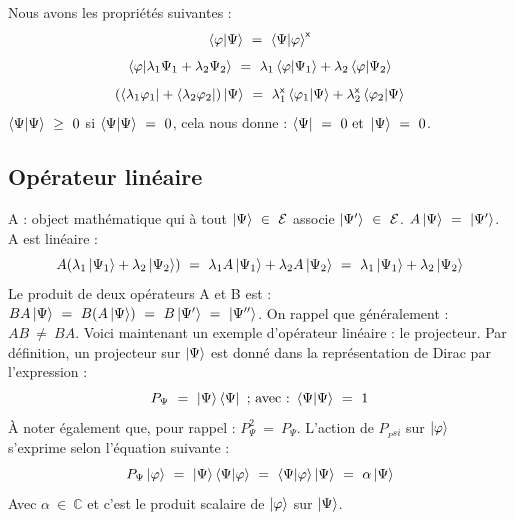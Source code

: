 \documentclass[12pt,a4paper,titlepage]{book}
\begin{document}
Nous avons les propriétés suivantes :\\
\begin{equation*}
\braket{\varphi | \Psi} ~=~ \braket{\Psi | \varphi}^{\mathsf{x}}
\end{equation*}
\begin{equation*}
\braket{\varphi | \lambda_1 \Psi_1 + \lambda_2 \Psi_2} ~=~ \lambda_1 \braket{\varphi | \Psi_1} + \lambda_2 \braket{\varphi | \Psi_2}
\end{equation*}
\begin{equation*}
\left( \bra{\lambda_1 \varphi_1} + \bra{\lambda_2 \varphi_2} \right) \ket{\Psi} ~=~ \lambda_1^{\mathsf{x}} \braket{\varphi_1 | \Psi} + \lambda_2^{\mathsf{x}} \braket{\varphi_2 | \Psi}
\end{equation*}
$\braket{\Psi | \Psi} ~\geq~ 0$ si $\braket{\Psi | \Psi} ~=~ 0$, cela nous donne : $\bra{\Psi} ~=~ 0 ~\text{et}~ \ket{\Psi} ~=~ 0$.

\subsection{Opérateur linéaire}
A : object mathématique qui à tout $\ket{\Psi} ~\in~ \mathcal{E}$ associe $\ket{\Psi'} ~\in~ \mathcal{E}$. $A \ket{\Psi} ~=~ \ket{\Psi'}$. A est linéaire :
\begin{equation*}
A (\lambda_1 \ket{\Psi_1} + \lambda_2 \ket{\Psi_2}) ~=~ \lambda_1 A \ket{\Psi_1} + \lambda_2 A \ket{\Psi_2} ~=~ \lambda_1 \ket{\Psi_1} + \lambda_2 \ket{\Psi_2} 
\end{equation*}
Le produit de deux opérateurs A et B est : $BA \ket{\Psi} ~=~ B(A \ket{\Psi}) ~=~ B \ket{\Psi'} ~=~ \ket{\Psi''}$. On rappel que généralement : $AB ~\neq~ BA$. Voici maintenant un exemple d'opérateur linéaire : le projecteur. Par définition, un projecteur sur $\ket{\Psi}$ est donné dans la représentation de Dirac par l'expression :
\begin{equation*}
P_{\Psi} ~=~ \ket{\Psi} \bra{\Psi} ~\text{; avec :}~ \braket{\Psi | \Psi} ~=~ 1
\end{equation*}
À noter également que, pour rappel : $P_{\Psi}^2 ~=~ P_{\Psi}$. L'action de $P_{_Psi}$ sur $\ket{\varphi}$ s'exprime selon l'équation suivante :
\begin{equation*}
P_{\Psi} \ket{\varphi} ~=~ \ket{\Psi} \braket{\Psi | \varphi} ~=~ \braket{\Psi | \varphi} \ket{\Psi} ~=~ \alpha \ket{\Psi}
\end{equation*}
Avec $\alpha ~\in~ \mathbb{C}$ et c'est le produit scalaire de $\ket{\varphi}$ sur $\ket{\Psi}$.\\
\end{document}
